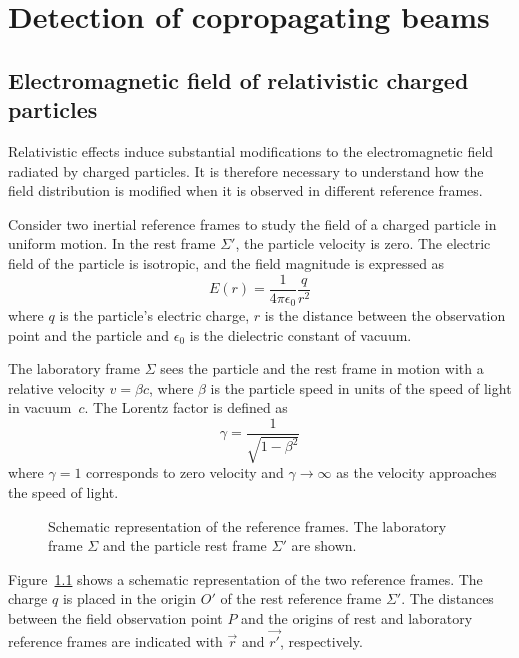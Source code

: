 \chapter[Detection of copropagating beams]{Detection of copropagating beams}\label{chapter:copropagating_beams}


\section[Electromagnetic field of relativistic charged particles]{Electromagnetic field of relativistic charged particles}


Relativistic effects induce substantial modifications to the electromagnetic field radiated by charged particles. It is therefore necessary to understand how the field distribution is modified when it is observed in different reference frames.

Consider two inertial reference frames to study the field of a charged particle in uniform motion. In the rest frame $\Sigma'$, the particle velocity is zero. The electric field of the particle is isotropic, and the field magnitude is expressed as
\begin{equation}
E(r) = \frac{1}{4\pi\epsilon_0} \frac{q}{r^2}
\end{equation}
where $q$ is the particle's electric charge, $r$ is the distance between the observation point and the particle  and $\epsilon_0$ is the dielectric constant of vacuum. 

The laboratory frame $\Sigma$ sees the particle and the rest frame in motion with a relative velocity $v = \beta c$, where $\beta$ is the particle speed in units of the speed of light in vacuum~$c$. The Lorentz factor is defined as 
\begin{equation}
    \gamma = \frac{1}{\sqrt{1-\beta^2}}
\end{equation}
where $\gamma = 1$ corresponds to zero velocity and $\gamma \rightarrow \infty$ as the velocity approaches the speed of light.


\begin{figure}[!t]
\centering

\caption{Schematic representation of the reference frames. The laboratory frame $\Sigma$ and the particle rest frame $\Sigma'$ are shown. }
\label{fig:frames}
\end{figure}

Figure~\ref{fig:frames} shows a schematic representation of the two reference frames. The charge $q$ is placed in the origin $O'$ of the rest reference frame $\Sigma'$. The distances between the field observation point $P$ and the origins of rest and laboratory reference frames are indicated with $\vec{r}$ and $\vec{r'}$, respectively. 


